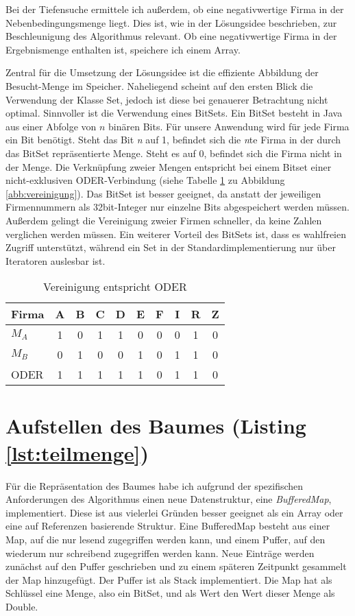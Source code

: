 Bei der Tiefensuche ermittele ich außerdem, ob eine negativwertige Firma in der Nebenbedingungsmenge liegt. Dies ist, wie in der Lösungsidee beschrieben, zur Beschleunigung des Algorithmus relevant. Ob eine negativwertige Firma in der Ergebnismenge enthalten ist, speichere ich einem Array.

Zentral für die Umsetzung der Lösungsidee ist die effiziente Abbildung der Besucht-Menge im Speicher. Naheliegend scheint auf den ersten Blick die Verwendung der Klasse Set, jedoch ist diese bei genauerer Betrachtung nicht optimal. Sinnvoller ist die Verwendung eines BitSets. Ein BitSet besteht in Java aus einer Abfolge von \(n\) binären Bits. Für unsere Anwendung wird für jede Firma ein Bit benötigt.
Steht das Bit \textit{n} auf 1, befindet sich die \textit{n}te Firma in der durch das BitSet repräsentierte Menge. Steht es auf 0, befindet sich die Firma nicht in der Menge.
Die Verknüpfung zweier Mengen entspricht bei einem Bitset einer nicht-exklusiven ODER-Verbindung (siehe Tabelle \ref{tab:veroder} zu Abbildung \ref{abb:vereinigung}).
Das BitSet ist besser geeignet, da anstatt der jeweiligen Firmennummern als 32bit-Integer nur einzelne Bits abgespeichert werden müssen. Außerdem gelingt die Vereinigung zweier Firmen schneller, da keine Zahlen verglichen werden müssen. Ein weiterer Vorteil des BitSets ist, dass es wahlfreien Zugriff unterstützt, während ein Set in der Standardimplementierung nur über Iteratoren auslesbar ist.
\begin{table}
	\centering
    \begin{tabular}{l|ccccccccc}
    Firma 	& A & B & C & D & E & F & I & R & Z \\ \hline
    \(M_A\)	& 1 & 0 & 1 & 1 & 0 & 0 & 0 & 1 & 0 \\
    \(M_B\)	& 0 & 1 & 0 & 0 & 1 & 0 & 1 & 1 & 0 \\ \hhline{=|*{9}{=}}
    ODER 	& 1 & 1 & 1 & 1 & 1 & 0 & 1 & 1 & 0 \\
    \end{tabular}
    \caption {Vereinigung entspricht ODER}
    \label{tab:veroder}
\end{table}

\section{Aufstellen des Baumes (Listing \ref{lst:teilmenge})}
Für die Repräsentation des Baumes habe ich aufgrund der spezifischen Anforderungen des Algorithmus einen neue Datenstruktur, eine \textit{BufferedMap}, implementiert. Diese ist aus vielerlei Gründen besser geeignet als ein Array oder eine auf Referenzen basierende Struktur.
Eine BufferedMap besteht aus einer Map, auf die nur lesend zugegriffen werden kann, und einem Puffer, auf den wiederum nur schreibend zugegriffen werden kann. Neue Einträge werden zunächst auf den Puffer geschrieben und zu einem späteren Zeitpunkt gesammelt der Map hinzugefügt. Der Puffer ist als Stack implementiert. Die Map hat als Schlüssel eine Menge, also ein BitSet, und als Wert den Wert dieser Menge als Double.


